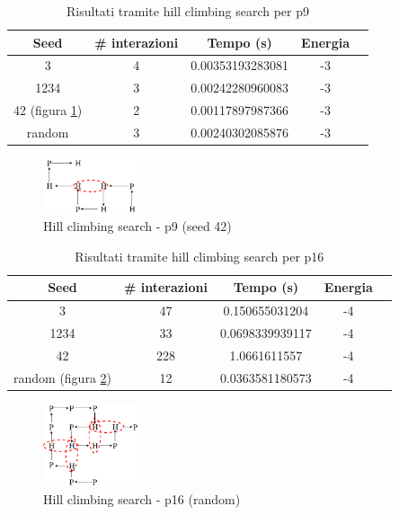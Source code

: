 \documentclass[conference]{IEEEtran}
\begin{document}
\begin{table}[H]
\begin{center}
\begin{tabular}{|c|c|c|c|c|}
\hline
\textbf{Seed} & \textbf{\# interazioni} & \textbf{Tempo (s)} & \textbf{Energia} \\ \hline
3 & 4 & 0.00353193283081 & -3 \\ \hline
1234 & 3 & 0.00242280960083 & -3 \\ \hline
42 (figura \ref{fig:lsp9}) & 2 & 0.00117897987366 & -3 \\ \hline
random & 3 & 0.00240302085876 & -3 \\ \hline
\end{tabular}
\end{center}
\caption{Risultati tramite hill climbing search per p9}
\end{table}

\begin{figure}[H]
\centering
\includegraphics[width=0.25\textwidth]{figure/p9LS.png}
\caption{Hill climbing search - p9 (seed 42)}
\label{fig:lsp9}
\end{figure}

\begin{table}[H]
\begin{center}
\begin{tabular}{|c|c|c|c|c|}
\hline
\textbf{Seed} & \textbf{\# interazioni} & \textbf{Tempo (s)} & \textbf{Energia} \\ \hline
3 & 47 & 0.150655031204 & -4 \\ \hline
1234 & 33 & 0.0698339939117 & -4 \\ \hline
42 & 228 & 1.0661611557 & -4 \\ \hline
random (figura \ref{fig:lsp16}) & 12 & 0.0363581180573 & -4 \\ \hline
\end{tabular}
\end{center}
\caption{Risultati tramite hill climbing search per p16}
\end{table}

\begin{figure}[H]
\centering
\includegraphics[width=0.25\textwidth]{figure/LSP16.png}
\caption{Hill climbing search - p16 (random)}
\label{fig:lsp16}
\end{figure}
\end{document}
